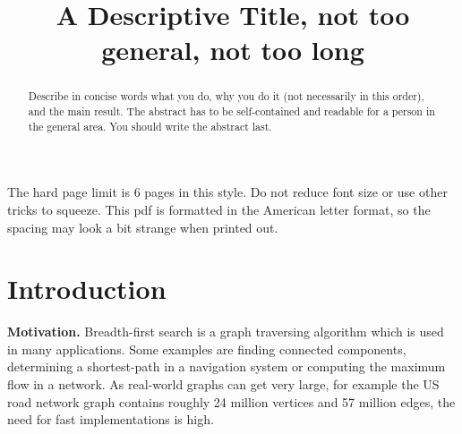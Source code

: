 \documentclass[letterpaper]{article}
\title{A Descriptive Title, not too general, not too long}
\newcommand{\mypar}[1]{{\bf #1.}}
\begin{document}
%
\maketitle
%

The hard page limit is 6 pages in this style. Do not reduce font size
or use other tricks to squeeze. This pdf is formatted in the American letter format, so the spacing may look a bit strange when printed out.

\begin{abstract}
Describe in concise words what you do, why you do it (not necessarily
in this order), and the main result.  The abstract has to be
self-contained and readable for a person in the general area. You
should write the abstract last.
\end{abstract}

\section{Introduction}\label{sec:intro}


\mypar{Motivation}
%
%
Breadth-first search is a graph traversing algorithm which is used in many applications. Some examples are finding connected components, determining a shortest-path in a navigation system or computing the maximum flow in a network. As real-world graphs can get very large, for example the US road network graph contains roughly 24 million vertices and 57 million edges, the need for fast implementations is high.
\end{document}
